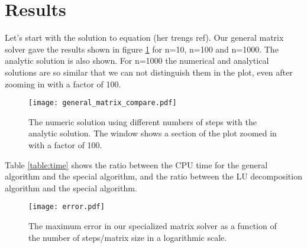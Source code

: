 \section{Results}
\label{sec:results}


%
%

Let's start with the solution to equation (her trengs ref). Our general matrix solver gave the results shown in figure \ref{fig:compare} for n=10, n=100 and n=1000. The analytic solution is also shown. For n=1000 the numerical and analytical solutions are so similar that we can not distinguish them in the plot, even after zooming in with a factor of 100. 
\begin{figure}[htbp]
	\centering
	\texttt{[image: general\_matrix\_compare.pdf]}
	\caption{The numeric solution using different numbers of steps with the analytic solution. The window shows a section of the plot zoomed in with a factor of 100.}
	\label{fig:compare}
\end{figure}

Table \ref{table:time} shows the ratio between the CPU time for the general algorithm and the special algorithm, and the ratio between the LU decomposition algorithm and the special algorithm.  

\begin{figure}[htbp]
	\centering
	\texttt{[image: error.pdf]}
	\caption{The maximum error in our specialized matrix solver as a function of the number of steps/matrix size in a logarithmic scale.}
	\label{fig:error}
\end{figure}

